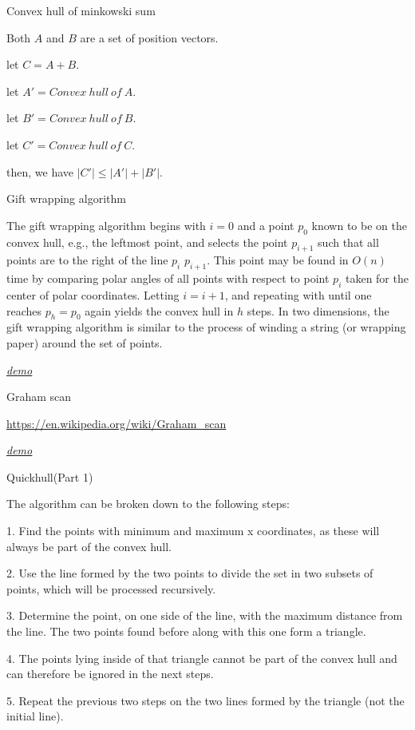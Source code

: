 \documentclass[UTF8]{beamer}
\begin{document}
	\begin{frame}{Convex hull of minkowski sum}

	Both $A$ and $B$ are a set of position vectors.

	let $C = A + B$.

	let $A' = Convex\ hull\ of\ A$.

	let $B' = Convex\ hull\ of\ B$.

	let $C' = Convex\ hull\ of\ C$.

	then, we have $|C'| \leq |A'| + |B'|$.

	\end{frame}

	\begin{frame}{Gift wrapping algorithm}

	The gift wrapping algorithm begins with $i=0$ and a point $p_0$ known to be on the convex hull, e.g., the leftmost point, and selects the point $p_{i+1}$ such that all points are to the right of the line $p_i$ $p_{i+1}$. This point may be found in $O(n)$ time by comparing polar angles of all points with respect to point $p_i$ taken for the center of polar coordinates. Letting $i=i+1$, and repeating with until one reaches $p_h=p_0$ again yields the convex hull in $h$ steps. In two dimensions, the gift wrapping algorithm is similar to the process of winding a string (or wrapping paper) around the set of points.

	\href{Gift_wrapping_algorithm.gif}{\emph{\underline{demo}}}

	\end{frame}

	\begin{frame}{Graham scan}

	\url{https://en.wikipedia.org/wiki/Graham_scan}

	\href{Graham_scan.gif}{\emph{\underline{demo}}}

	\end{frame}

	\begin{frame}{Quickhull(Part 1)}

	The algorithm can be broken down to the following steps:

	1. Find the points with minimum and maximum x coordinates, as these will always be part of the convex hull.

	2. Use the line formed by the two points to divide the set in two subsets of points, which will be processed recursively.

	3. Determine the point, on one side of the line, with the maximum distance from the line. The two points found before along with this one form a triangle.

	4. The points lying inside of that triangle cannot be part of the convex hull and can therefore be ignored in the next steps.

	5. Repeat the previous two steps on the two lines formed by the triangle (not the initial line).

	\end{frame}
\end{document}
